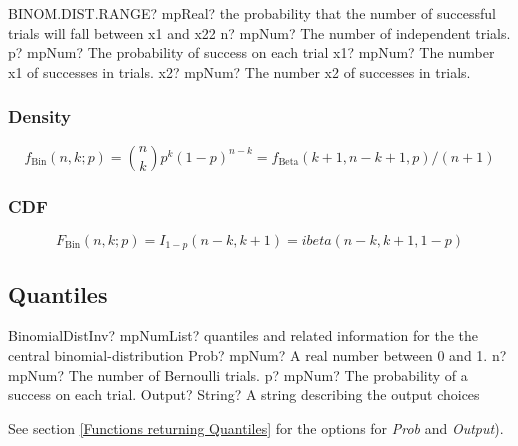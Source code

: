 \vspace{0.6cm}
\begin{mpFunctionsExtract}
	\mpWorksheetFunctionFourNotImplemented
	{BINOM.DIST.RANGE? mpReal?  the probability that the number of successful trials will fall between x1 and x22}
	{n? mpNum? The number of independent trials.}
	{p? mpNum? The probability of success on each trial}
	{x1? mpNum? The number x1 of successes in trials.}
	{x2? mpNum? The number x2 of successes in trials.}
\end{mpFunctionsExtract}



\subsubsection{Density}
\label{BinomialDistributionDensity}

\begin{equation} 
	f_{\text{Bin}}(n, k; p) = \binom{n}{k} p^k (1-p)^{n-k} = f_{\text{Beta}}(k+1,n-k+1,p)/(n+1)
\end{equation}


\subsubsection{CDF}
\label{BinomialDistributionCDF}
\begin{equation} 
	F_{\text{Bin}}(n, k; p) = I_{1-p}(n-k,k+1) = ibeta(n-k,k+1,1-p)
\end{equation}



\subsection{Quantiles}


\begin{mpFunctionsExtract}
	\mpFunctionFourNotImplemented
	{BinomialDistInv? mpNumList? quantiles and related information for the the central binomial-distribution}
	{Prob? mpNum? A real number between 0 and 1.}
	{n? mpNum? The number of Bernoulli trials.}
	{p? mpNum? The probability of a success on each trial.}
	{Output? String? A string describing the output choices}
\end{mpFunctionsExtract}

\vspace{0.3cm}
See section \ref{Functions returning Quantiles} for the options for  {\itshape\sffamily Prob} and {\itshape\sffamily Output}). 

